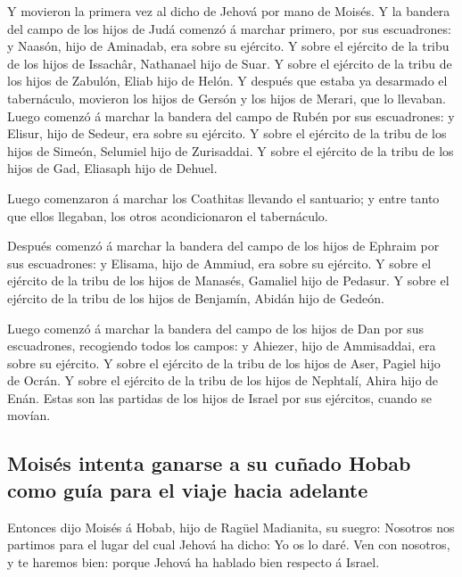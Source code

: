  Y movieron la primera vez al dicho de Jehová por mano de
Moisés.  Y la bandera del campo de los hijos de Judá
comenzó á marchar primero, por sus escuadrones: y Naasón, hijo de
Aminadab, era sobre su ejército.  Y sobre el ejército de
la tribu de los hijos de Issachâr, Nathanael hijo de Suar.
 Y sobre el ejército de la tribu de los hijos de Zabulón,
Eliab hijo de Helón.  Y después que estaba ya desarmado
el tabernáculo, movieron los hijos de Gersón y los hijos de Merari, que
lo llevaban.  Luego comenzó á marchar la bandera del
campo de Rubén por sus escuadrones: y Elisur, hijo de Sedeur, era sobre
su ejército.  Y sobre el ejército de la tribu de los
hijos de Simeón, Selumiel hijo de Zurisaddai.  Y sobre el
ejército de la tribu de los hijos de Gad, Eliasaph hijo de Dehuel.

 Luego comenzaron á marchar los Coathitas llevando el
santuario; y entre tanto que ellos llegaban, los otros acondicionaron el
tabernáculo.

 Después comenzó á marchar la bandera del campo de los
hijos de Ephraim por sus escuadrones: y Elisama, hijo de Ammiud, era
sobre su ejército.  Y sobre el ejército de la tribu de
los hijos de Manasés, Gamaliel hijo de Pedasur.  Y sobre
el ejército de la tribu de los hijos de Benjamín, Abidán hijo de Gedeón.

 Luego comenzó á marchar la bandera del campo de los
hijos de Dan por sus escuadrones, recogiendo todos los campos: y
Ahiezer, hijo de Ammisaddai, era sobre su ejército.  Y
sobre el ejército de la tribu de los hijos de Aser, Pagiel hijo de
Ocrán.  Y sobre el ejército de la tribu de los hijos de
Nephtalí, Ahira hijo de Enán.  Estas son las partidas de
los hijos de Israel por sus ejércitos, cuando se movían.

\hypertarget{moisuxe9s-intenta-ganarse-a-su-cuuxf1ado-hobab-como-guuxeda-para-el-viaje-hacia-adelante}{%
\subsection{Moisés intenta ganarse a su cuñado Hobab como guía para el
viaje hacia
adelante}\label{moisuxe9s-intenta-ganarse-a-su-cuuxf1ado-hobab-como-guuxeda-para-el-viaje-hacia-adelante}}

 Entonces dijo Moisés á Hobab, hijo de Ragüel Madianita,
su suegro: Nosotros nos partimos para el lugar del cual Jehová ha dicho:
Yo os lo daré. Ven con nosotros, y te haremos bien: porque Jehová ha
hablado bien respecto á Israel.

